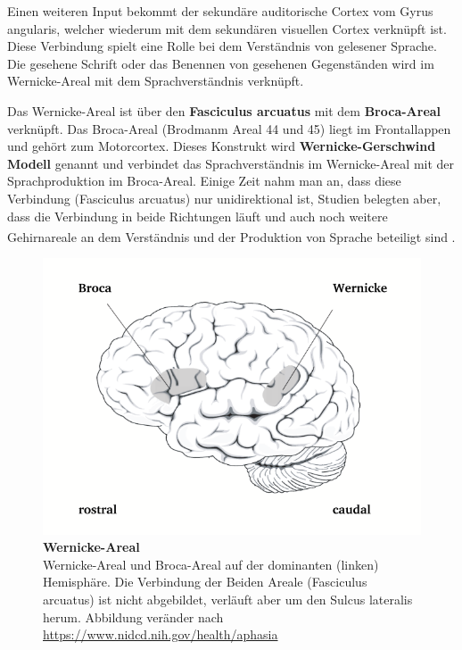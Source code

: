 \documentclass[12pt,a4paper,pdftex]{article}
\begin{document}
Einen weiteren Input bekommt der sekundäre auditorische Cortex vom Gyrus angularis, welcher wiederum mit dem sekundären visuellen Cortex verknüpft ist. Diese Verbindung spielt eine Rolle bei dem Verständnis von gelesener Sprache. Die gesehene Schrift oder das Benennen von gesehenen Gegenständen wird im Wernicke-Areal mit dem Sprachverständnis verknüpft. 

Das Wernicke-Areal ist über den \textbf{Fasciculus arcuatus}  mit dem \textbf{Broca-Areal}  verknüpft. Das Broca-Areal (Brodmanm Areal 44 und 45) liegt im Frontallappen und gehört zum Motorcortex. Dieses Konstrukt wird \textbf{Wernicke-Gerschwind Modell}  genannt und verbindet das Sprachverständnis im Wernicke-Areal mit der Sprachproduktion im Broca-Areal. Einige Zeit nahm man an, dass diese Verbindung (Fasciculus arcuatus) nur unidirektional ist, Studien belegten aber, dass die Verbindung in beide Richtungen läuft und auch noch weitere Gehirnareale an dem Verständnis und der Produktion von Sprache beteiligt sind \textsuperscript{\cite[60]{kandel2013principles}}.

\begin{figure}[H]
    \centering
    \includegraphics{pictures/auditory/Wernicke.png}
    \caption[Wernicke-Areal]{\textbf{Wernicke-Areal}\\ 
    Wernicke-Areal und Broca-Areal auf der dominanten (linken) Hemisphäre. Die Verbindung der Beiden Areale (Fasciculus arcuatus) ist nicht abgebildet, verläuft aber um den Sulcus lateralis herum.
    Abbildung veränder nach \url{https://www.nidcd.nih.gov/health/aphasia}}
    \label{fig:Wernicke}
\end{figure}
\end{document}
